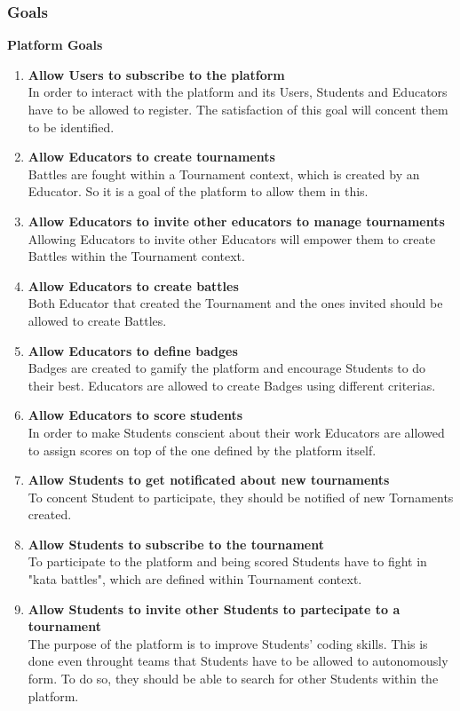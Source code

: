 \subsubsection{Goals}
\textbf{Platform Goals}
\begin{enumerate}[label=$\bullet$ \textbf{GP\arabic*:}]
    \item \textbf{Allow Users to subscribe to the platform}\\In order to interact with the platform and its Users, Students and Educators have to be allowed to register. The satisfaction of this goal will concent them to be identified.
    \item \textbf{Allow Educators to create tournaments}\\Battles are fought within a Tournament context, which is created by an Educator. So it is a goal of the platform to allow them in this. 
    \item \textbf{Allow Educators to invite other educators to manage tournaments}\\Allowing Educators to invite other Educators will empower them to create Battles within the Tournament context. 
    \item \textbf{Allow Educators to create battles}\\Both Educator that created the Tournament and the ones invited should be allowed to create Battles. 
    \item \textbf{Allow Educators to define badges}\\Badges are created to gamify the platform and encourage Students to do their best. Educators are allowed to create Badges using different criterias.
    \item \textbf{Allow Educators to score students}\\In order to make Students conscient about their work Educators are allowed to assign scores on top of the one defined by the platform itself.
    \item \textbf{Allow Students to get notificated about new tournaments}\\To concent Student to participate, they should be notified of new Tornaments created.
    \item \textbf{Allow Students to subscribe to the tournament}\\To participate to the platform and being scored Students have to fight in "kata battles", which are defined within Tournament context.
    \item \textbf{Allow Students to invite other Students to partecipate to a tournament}\\The purpose of the platform is to improve Students' coding skills. This is done even throught teams that Students have to be allowed to autonomously form. To do so, they should be able to search for other Students within the platform.
\end{enumerate}
